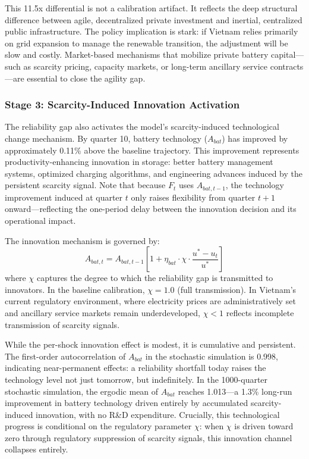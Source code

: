\documentclass[12pt, a4paper]{article}
\begin{document}
This 11.5x differential is not a calibration artifact. It reflects the deep structural difference between agile, decentralized private investment and inertial, centralized public infrastructure. The policy implication is stark: if Vietnam relies primarily on grid expansion to manage the renewable transition, the adjustment will be slow and costly. Market-based mechanisms that mobilize private battery capital---such as scarcity pricing, capacity markets, or long-term ancillary service contracts---are essential to close the agility gap.

\subsubsection{Stage 3: Scarcity-Induced Innovation Activation}

The reliability gap also activates the model's scarcity-induced technological change mechanism. By quarter 10, battery technology ($A_{bat}$) has improved by approximately 0.11\% above the baseline trajectory. This improvement represents productivity-enhancing innovation in storage: better battery management systems, optimized charging algorithms, and engineering advances induced by the persistent scarcity signal. Note that because $F_t$ uses $A_{bat,t-1}$, the technology improvement induced at quarter $t$ only raises flexibility from quarter $t+1$ onward---reflecting the one-period delay between the innovation decision and its operational impact.

The innovation mechanism is governed by:
\begin{equation}
A_{bat,t} = A_{bat,t-1} \left[1 + \eta_{bat} \cdot \chi \cdot \frac{u^* - u_t}{u^*} \right]
\end{equation}
where $\chi$ captures the degree to which the reliability gap is transmitted to innovators. In the baseline calibration, $\chi = 1.0$ (full transmission). In Vietnam's current regulatory environment, where electricity prices are administratively set and ancillary service markets remain underdeveloped, $\chi < 1$ reflects incomplete transmission of scarcity signals.

While the per-shock innovation effect is modest, it is cumulative and persistent. The first-order autocorrelation of $A_{bat}$ in the stochastic simulation is 0.998, indicating near-permanent effects: a reliability shortfall today raises the technology level not just tomorrow, but indefinitely. In the 1000-quarter stochastic simulation, the ergodic mean of $A_{bat}$ reaches 1.013---a 1.3\% long-run improvement in battery technology driven entirely by accumulated scarcity-induced innovation, with no R\&D expenditure. Crucially, this technological progress is conditional on the regulatory parameter $\chi$: when $\chi$ is driven toward zero through regulatory suppression of scarcity signals, this innovation channel collapses entirely.
\end{document}
